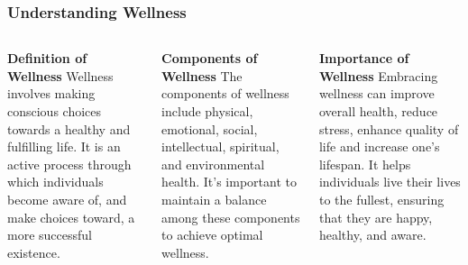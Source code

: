 \documentclass[5pt]{beamer}
\begin{document}
\begin{frame}
\frametitle{Understanding Wellness}
\begin{columns}
\begin{column}{0.3\textwidth}
\begin{block}{\textbf{Definition of Wellness}}
Wellness involves making conscious choices towards a healthy and fulfilling life. It is an active process through which individuals become aware of, and make choices toward, a more successful existence.
\end{block}
\end{column}
\begin{column}{0.3\textwidth}
\begin{block}{\textbf{Components of Wellness}}
The components of wellness include physical, emotional, social, intellectual, spiritual, and environmental health. It's important to maintain a balance among these components to achieve optimal wellness.
\end{block}
\end{column}
\begin{column}{0.3\textwidth}
\begin{block}{\textbf{Importance of Wellness}}
Embracing wellness can improve overall health, reduce stress, enhance quality of life and increase one's lifespan. It helps individuals live their lives to the fullest, ensuring that they are happy, healthy, and aware.
\end{block}
\end{column}
\end{columns}
\end{frame}
\end{document}
